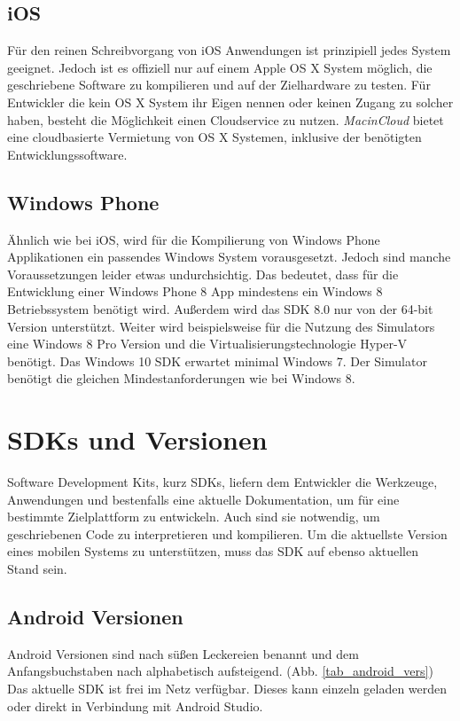 \subsection{iOS}
Für den reinen Schreibvorgang von iOS Anwendungen ist prinzipiell jedes System geeignet. Jedoch ist es offiziell nur auf einem Apple OS X System möglich, die geschriebene Software zu kompilieren und auf der Zielhardware zu testen. Für Entwickler die kein OS X System ihr Eigen nennen oder keinen Zugang zu solcher haben, besteht die Möglichkeit einen Cloudservice zu nutzen. \textit{MacinCloud} bietet eine cloudbasierte Vermietung von OS X Systemen, inklusive der benötigten Entwicklungssoftware. \citep{macincloud}

\subsection{Windows Phone}
Ähnlich wie bei iOS, wird für die Kompilierung von Windows Phone Applikationen ein passendes Windows System vorausgesetzt. Jedoch sind manche Voraussetzungen leider etwas undurchsichtig. Das bedeutet, dass für die Entwicklung einer Windows Phone 8 App mindestens ein Windows 8 Betriebssystem benötigt wird. Außerdem wird das SDK 8.0 nur von der 64-bit Version unterstützt. Weiter wird beispielsweise für die Nutzung des Simulators eine Windows 8 Pro Version und die Virtualisierungstechnologie Hyper-V benötigt. Das Windows 10 SDK erwartet minimal Windows 7. Der Simulator benötigt die gleichen Mindestanforderungen wie bei Windows 8. \citep{WP8_requirements, WP10_SDK, WP10_Emulator} 

\section{SDKs und Versionen}
Software Development Kits, kurz SDKs, liefern dem Entwickler die Werkzeuge, Anwendungen und bestenfalls eine aktuelle Dokumentation, um für eine bestimmte Zielplattform zu entwickeln. Auch sind sie notwendig, um geschriebenen Code zu interpretieren und kompilieren. Um die aktuellste Version eines mobilen Systems zu unterstützen, muss das SDK auf ebenso aktuellen Stand sein.
\clearpage 

\subsection{Android Versionen}
Android Versionen sind nach süßen Leckereien benannt und dem Anfangsbuchstaben nach alphabetisch aufsteigend. (Abb. \ref{tab_android_vers})
Das aktuelle SDK ist frei im Netz verfügbar. Dieses kann einzeln geladen werden oder direkt in Verbindung mit Android Studio.

